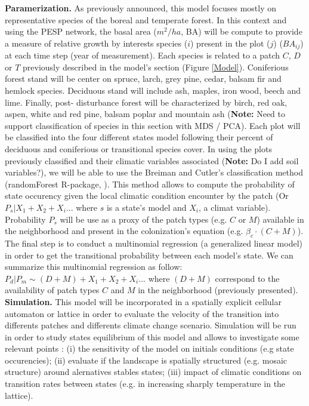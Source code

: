 \textbf{Paramerization.} As previously announced, this model focuses mostly on
representative species of the boreal and temperate forest. In this context and
using the PESP network, the basal area ($m^2/ha$, BA) will be compute to
provide a measure of relative growth by interests species ($i$) present in the
plot ($j$) ($BA_{ij}$) at each time step (year of measurement). Each species
is related to a patch $C$, $D$ or $T$ previously described in the model's
section (Figure \ref{Model}). Coniferious forest stand will be center on
spruce, larch, grey pine, cedar, balsam fir and hemlock species. Deciduous
stand will include ash, maples, iron wood, beech and lime. Finally, post-
disturbance forest will be characterized by birch, red oak, aspen, white and
red pine, balsam poplar and mountain ash (\textbf{Note:} Need to support
classification of species in this section with MDS / PCA). Each plot will be
classified into the four different states model following their percent of
deciduous and coniferious or transitional species cover. In using the plots
previously classified and their climatic variables associated (\textbf{Note:}
Do I add soil variables?), we will be able to use the Breiman and Cutler's
classification method (randomForest R-package, \cite{Liaw2002a}). This method
allows to compute the probability of state occurency given the local climatic
condition encounter by the patch (Or $P_{s}|X_1+X_2+X_i...$ where $s$ is a
state's model and $X_i$, a climat variable). Probability $P_s$ will be use as
a proxy of the patch types (e.g. $C$ or $M$) available in the neighborhood and
present in the colonization's equation (e.g. $\beta_c \cdot (C+M)$). The final
step is to conduct a multinomial regression (a generalized linear model) in
order to get the transitional probability between each model's state. We can
summarize this multinomial regression as follow: $P_{d}|P_{m} \sim (D+M) +
X_1+X_2+X_i... $ where $(D+M)$ correspond to the availability of patch types
$C$ and $M$ in the neighborhood (previously presented).\\



\textbf{Simulation.} This model will be incorporated in a spatially explicit
cellular automaton or lattice in order to evaluate the velocity of the
transition into differents patches and differents climate change scenario.
Simulation will be run in order to study states equilibrium of this model and
allows to investigate some relevant points : (i) the sensitivity of
the model on initials conditions (e.g state occurencies); (ii) evaluate if the
landscape is spatially structured (e.g. mosaic structure) around alernatives
stables states; (iii) impact of climatic conditions on transition rates
between states (e.g. in increasing sharply temperature in the lattice). \\


